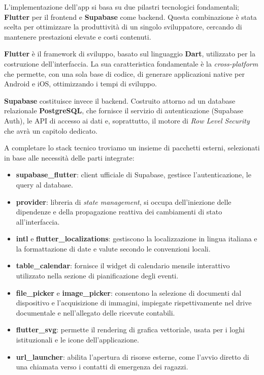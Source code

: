 \documentclass[11pt]{article}
\numberwithin{figure}{section}
\begin{document}
L'implementazione dell'app si basa su due pilastri tecnologici fondamentali; \textbf{Flutter} per il frontend e \textbf{Supabase} come backend. Questa combinazione è stata scelta per ottimizzare la produttività di un singolo sviluppatore, cercando di mantenere prestazioni elevate e costi contenuti.

\textbf{Flutter} è il framework di sviluppo, basato sul linguaggio \textbf{Dart}, utilizzato per la costruzione dell'interfaccia. La sua caratteristica fondamentale è la \textit{cross-platform} che permette, con una sola base di codice, di generare applicazioni native per Android e iOS, ottimizzando i tempi di sviluppo.

\textbf{Supabase} costituisce invece il backend. Costruito attorno ad un database relazionale \textbf{PostgreSQL}, che fornisce il servizio di autenticazione (Supabase Auth), le API di accesso ai dati e, soprattutto, il motore di \textit{Row Level Security} che avrà un capitolo dedicato.

A completare lo stack tecnico troviamo un insieme di pacchetti esterni, selezionati in base alle necessità delle parti integrate:
\begin{itemize}[topsep=0.5pt]
  \item \textbf{supabase\_flutter}: client ufficiale di Supabase, gestisce l'autenticazione, le query al database.
  \item \textbf{provider}: libreria di \textit{state management}, si occupa dell'iniezione delle dipendenze e della propagazione reattiva dei cambiamenti di stato all'interfaccia.
  \item \textbf{intl} e \textbf{flutter\_localizations}: gestiscono la localizzazione in lingua italiana e la formattazione di date e valute secondo le convenzioni locali.
  \item \textbf{table\_calendar}: fornisce il widget di calendario mensile interattivo utilizzato nella sezione di pianificazione degli eventi.
  \item \textbf{file\_picker} e \textbf{image\_picker}: consentono la selezione di documenti dal dispositivo e l'acquisizione di immagini, impiegate rispettivamente nel drive documentale e nell'allegato delle ricevute contabili.
  \item \textbf{flutter\_svg}: permette il rendering di grafica vettoriale, usata per i loghi istituzionali e le icone dell'applicazione.
  \item \textbf{url\_launcher}: abilita l'apertura di risorse esterne, come l'avvio diretto di una chiamata verso i contatti di emergenza dei ragazzi.
\end{itemize}
\end{document}
